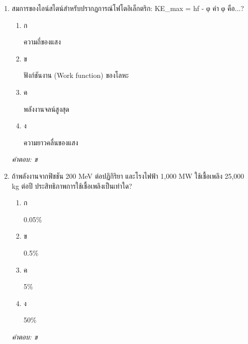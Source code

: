 \documentclass[12pt]{article}
\begin{document}
\begin{enumerate}[label=\arabic*., itemsep=0.5\baselineskip, topsep=0.5\baselineskip, leftmargin=*]
\item สมการของไอน์สไตน์สำหรับปรากฏการณ์โฟโตอิเล็กตริก: KE\_max = hf - φ ค่า φ คือ...?
\begin{enumerate}[label=\alph*)., itemsep=0.3\baselineskip, topsep=0.3\baselineskip]
\item ก\ 
\begin{minipage}[t]{0.9\linewidth}
\raggedright ความถี่ของแสง
\end{minipage}
\item ข\ 
\begin{minipage}[t]{0.9\linewidth}
\raggedright ฟังก์ชันงาน (Work function) ของโลหะ
\end{minipage}
\item ค\ 
\begin{minipage}[t]{0.9\linewidth}
\raggedright พลังงานจลน์สูงสุด
\end{minipage}
\item ง\ 
\begin{minipage}[t]{0.9\linewidth}
\raggedright ความยาวคลื่นของแสง
\end{minipage}
\end{enumerate}
\vspace{-0.3\baselineskip}
\begin{small}
\textit{คำตอบ: ข}
\end{small}

\item ถ้าพลังงานจากฟิชชัน 200 MeV ต่อปฏิกิริยา และโรงไฟฟ้า 1,000 MW ใช้เชื้อเพลิง 25,000 kg ต่อปี ประสิทธิภาพการใช้เชื้อเพลิงเป็นเท่าใด?
\begin{enumerate}[label=\alph*)., itemsep=0.3\baselineskip, topsep=0.3\baselineskip]
\item ก\ 
\begin{minipage}[t]{0.9\linewidth}
\raggedright 0.05\%
\end{minipage}
\item ข\ 
\begin{minipage}[t]{0.9\linewidth}
\raggedright 0.5\%
\end{minipage}
\item ค\ 
\begin{minipage}[t]{0.9\linewidth}
\raggedright 5\%
\end{minipage}
\item ง\ 
\begin{minipage}[t]{0.9\linewidth}
\raggedright 50\%
\end{minipage}
\end{enumerate}
\vspace{-0.3\baselineskip}
\begin{small}
\textit{คำตอบ: ข}
\end{small}


\end{enumerate}
\end{document}
